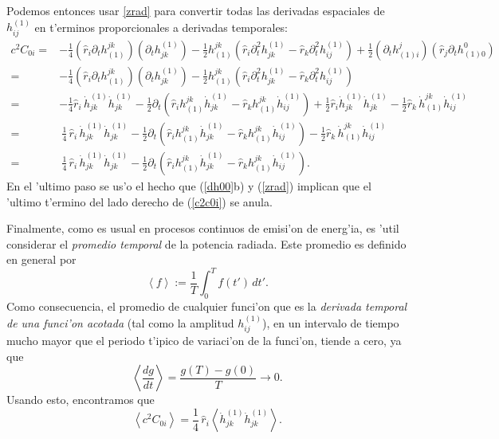 Podemos entonces usar \eqref{zrad} para convertir todas las derivadas espaciales de $h^{(1)}_{ij}$ en t'erminos proporcionales a derivadas temporales:
\begin{align}
c^2C_{0i} = & -\frac{1}{4}(\hat{r}_i\partial_t h^{jk}_{(1)})(\partial_t h_{jk}^{(1)})
-\frac{1}{2}h^{jk}_{(1)}\left(\hat{r}_i\partial^2_t h^{(1)}_{jk}-\hat{r}_k\partial^2_t
h^{(1)}_{ij}\right)
+ \frac{1}{2}(\partial_t h^j_{(1)i})(\hat{r}_j \partial_t h^0_{(1)0})\\
= & -\frac{1}{4}(\hat{r}_i\partial_t h^{jk}_{(1)})(\partial_t h_{jk}^{(1)})
-\frac{1}{2}h^{jk}_{(1)}\left(\hat{r}_i\partial^2_t h^{(1)}_{jk}-\hat{r}_k\partial^2_t
h^{(1)}_{ij}\right) \\
= & -\frac{1}{4}\hat{r}_i\,\dot{h}_{jk}^{(1)}\dot{h}_{jk}^{(1)}
-\frac{1}{2}\partial_t\left(\hat{r}_i h^{jk}_{(1)}\dot{h}^{(1)}_{jk}-\hat{r}_kh^{jk}_{(1)}\dot{h}^{(1)}_{ij}\right)
+\frac{1}{2}\hat{r}_i\dot{h}^{(1)}_{jk}\dot{h}^{(1)}_{jk}
-\frac{1}{2}\hat{r}_k\,\dot{h}^{jk}_{(1)}\dot{h}^{(1)}_{ij}\\
= &\ \frac{1}{4}\,\hat{r}_i\,\dot{h}_{jk}^{(1)}\dot{h}_{jk}^{(1)} -\frac{1}{2}\partial_t\left(\hat{r}_i h^{jk}_{(1)}\dot{h}^{(1)}_{jk}-\hat{r}_kh^{jk}_{(1)}\dot{h}^{(1)}_{ij}\right)
-\frac{1}{2}\hat{r}_k\,\dot{h}^{jk}_{(1)}\dot{h}^{(1)}_{ij} \label{c2c0i}\\
= &\ \frac{1}{4}\,\hat{r}_i\,\dot{h}_{jk}^{(1)}\dot{h}_{jk}^{(1)}
-\frac{1}{2}\partial_t\left(\hat{r}_i h^{jk}_{(1)}\dot{h}^{(1)}_{jk} -\hat{r}_kh^{jk}_{(1)}\dot{h}^{(1)}_{ij}\right).
\end{align}
En el 'ultimo paso se us'o el hecho que (\ref{dh00}b) y (\ref{zrad}) implican que el 'ultimo t'ermino del lado derecho de (\ref{c2c0i}) se anula.

Finalmente, como es usual en procesos continuos de emisi'on de energ'ia, es 'util considerar el \textit{promedio temporal} de la potencia radiada. Este promedio es definido en general por
\begin{equation}
\left\langle f\right\rangle :=\frac{1}{T}\int_0^T f(t')\,dt'.
\end{equation}
Como consecuencia, el promedio de cualquier funci'on que es la \textit{derivada temporal de una funci'on acotada} (tal como la amplitud $h_{ij}^{(1)}$), en un intervalo de tiempo mucho mayor que el periodo t'ipico de variaci'on de la funci'on, tiende a cero, ya  que
\begin{equation}
\left\langle \frac{dg}{dt}\right\rangle=\frac{g(T)-g(0)}{T}\to 0.
\end{equation}
Usando esto, encontramos que
\begin{equation}
\left\langle c^2C_{0i}\right\rangle=\frac{1}{4}\,\hat{r}_i\left\langle\dot{h}_{jk}^{(1)}\dot{h}_{jk}^{(1)}\right\rangle .
\end{equation}

